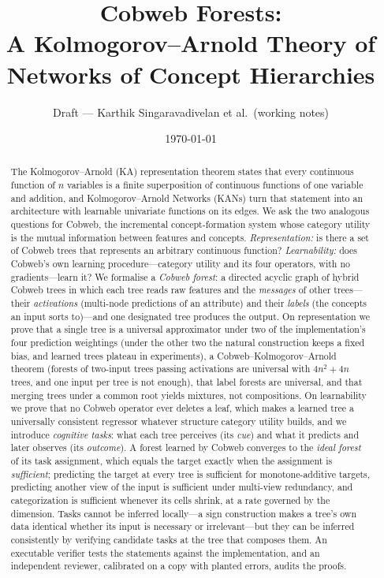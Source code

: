 \documentclass[11pt]{article}
\title{Cobweb Forests:\\ A Kolmogorov--Arnold Theory of Networks of Concept Hierarchies}
\author{Draft --- Karthik Singaravadivelan et al.\ (working notes)}
\date{\today}
\theoremstyle{definition}
\theoremstyle{remark}
\begin{document}
\maketitle

\begin{abstract}
The Kolmogorov--Arnold (KA) representation theorem states that every continuous
function of $n$ variables is a finite superposition of continuous functions of one
variable and addition, and Kolmogorov--Arnold Networks (KANs) turn that statement into
an architecture with learnable univariate functions on its edges.  We ask the two
analogous questions for Cobweb, the incremental concept-formation system whose
category utility is the mutual information between features and concepts.
\emph{Representation:} is there a set of Cobweb trees that represents an arbitrary
continuous function?  \emph{Learnability:} does Cobweb's own learning
procedure---category utility and its four operators, with no gradients---learn it?
We formalise a \emph{Cobweb forest}: a directed acyclic graph of hybrid Cobweb trees in
which each tree reads raw features and the \emph{messages} of other trees---their
\emph{activations} (multi-node predictions of an attribute) and their \emph{labels}
(the concepts an input sorts to)---and one designated tree produces the output.
On representation we prove that a single tree is a universal approximator under two of
the implementation's four prediction weightings (under the other two the natural
construction keeps a fixed bias, and learned trees plateau in experiments), a
Cobweb--Kolmogorov--Arnold theorem (forests of two-input trees passing activations are
universal with $4n^2+4n$ trees, and one input per tree is not enough), that label forests
are universal, and that merging trees under a common root yields mixtures, not
compositions.  On learnability we prove that no Cobweb operator ever deletes a leaf,
which makes a learned tree a universally consistent regressor whatever structure
category utility builds, and we introduce \emph{cognitive tasks}: what each tree
perceives (its \emph{cue}) and what it predicts and later observes (its
\emph{outcome}).  A forest learned by Cobweb converges to the \emph{ideal forest} of its
task assignment, which equals the target exactly when the assignment is
\emph{sufficient}; predicting the target at every tree is sufficient for
monotone-additive targets, predicting another view of the input is sufficient under
multi-view redundancy, and categorization is sufficient whenever its cells shrink, at a
rate governed by the dimension.  Tasks cannot be inferred locally---a sign construction makes a tree's
own data identical whether its input is necessary or irrelevant---but they can be
inferred consistently by verifying candidate tasks at the tree that composes them.  An
executable verifier tests the statements against the implementation, and an independent
reviewer, calibrated on a copy with planted errors, audits the proofs.
\end{abstract}
\end{document}

